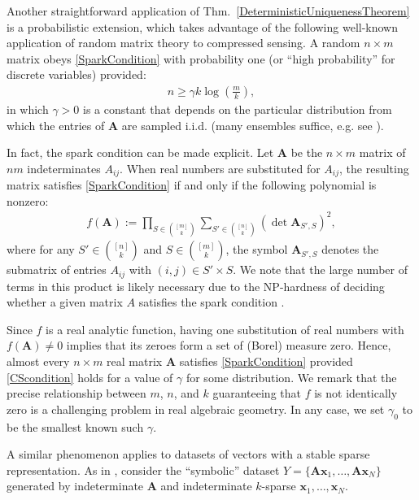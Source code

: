 \documentclass[9pt,twocolumn]{pnas-new}
\begin{document}
Another straightforward application of Thm.~\ref{DeterministicUniquenessTheorem} is a probabilistic extension, which takes advantage of the following well-known application of random matrix theory to compressed sensing.  A random $n \times m$ matrix obeys \eqref{SparkCondition} with probability one (or ``high probability'' for discrete variables) 
provided:
\begin{align}\label{CScondition}
n \geq \gamma k\log\left(\frac{m}{k}\right),
\end{align}
in which $\gamma >0$ is a constant that depends on the particular distribution from which the entries of $\mathbf{A}$ are sampled i.i.d. (many ensembles suffice, e.g. see \cite[Sec.~4]{Baraniuk08}). 

In fact, 
the spark condition can be made explicit.  Let $\mathbf{A}$  be the $n \times m$ matrix of $nm$ indeterminates $A_{ij}$. When real numbers are substituted for $A_{ij}$, the resulting matrix satisfies \eqref{SparkCondition} if and only if the following polynomial is nonzero:
\begin{align*}
f(\mathbf{A}) := \prod_{S \in {[m] \choose k}} \sum_{S' \in {[n] \choose k}} (\det \mathbf{A}_{S',S})^2,
\end{align*}
%
where for any $S' \in {[n] \choose k}$ and $S \in {[m] \choose k}$, the symbol $\mathbf{A}_{S',S}$ denotes the submatrix of entries $A_{ij}$ with $(i,j) \in S' \times S$.   We note that the large number of terms in this product is likely necessary due to the NP-hardness of deciding whether a given matrix $A$ satisfies the spark condition \cite{tillmann2014computational}.

Since $f$ is a real analytic function, having one substitution of real numbers with $f(\mathbf{A}) \neq 0$ implies that its zeroes form a set of (Borel) measure zero. Hence, almost every $n \times m$ real matrix $\mathbf{A}$ satisfies \eqref{SparkCondition} provided \eqref{CScondition} holds for a value of $\gamma$ for some distribution. We remark that the precise relationship between $m$, $n$, and $k$ guaranteeing that $f$ is not identically zero is a challenging problem in real algebraic geometry. In any case, we set $\gamma_0$ to be the smallest known such $\gamma$.

A similar phenomenon applies to datasets of vectors with a stable sparse representation. As in \cite[Sec.~IV]{Hillar15}, consider the ``symbolic'' dataset $Y = \{\mathbf{A}\mathbf{x}_1,\ldots,\mathbf{A} \mathbf{x}_N\}$ generated by indeterminate $\mathbf{A}$ and indeterminate $k$-sparse $\mathbf{x}_1, \ldots, \mathbf{x}_N$.  
\end{document}
